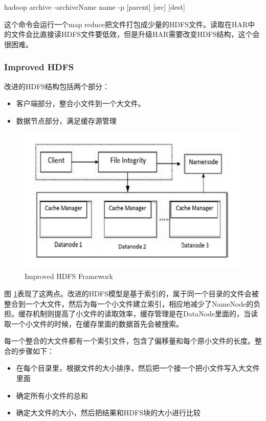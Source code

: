 \documentclass[UTF8]{ctexart}
\begin{document}
hadoop archive -archiveName name -p [parent] [src] [dest]

这个命令会运行一个map reduce把文件打包成少量的HDFS文件。读取在HAR中的文件会比直接读HDFS文件要低效，但是升级HAR需要改变HDFS结构，这个会很困难。


\subsubsection{Improved HDFS}
改进的HDFS结构\cite{ChenJ}包括两个部分：

\begin{itemize}
\item 客户端部分，整合小文件到一个大文件。
\item 数据节点部分，满足缓存源管理
\end{itemize}

\begin{figure}[h]
\centering
\includegraphics{ImprovedHDFSFramework.PNG}
\caption{Improved HDFS Framework}
\label{fig:ImprovedHDFSFramework}
\end{figure}

图 \ref{fig:ImprovedHDFSFramework}表现了这两点。改进的HDFS模型是基于索引的，属于同一个目录的文件会被整合到一个大文件，然后为每一个小文件建立索引，相应地减少了NameNode的负担。缓存机制则提高了小文件的读取效率，缓存管理是在DataNode里面的，当读取一个小文件的时候，在缓存里面的数据首先会被搜索。

每一个整合的大文件都有一个索引文件，包含了偏移量和每个原小文件的长度。整合的步骤如下：

\begin{itemize}
\item 在每个目录里，根据文件的大小排序，然后把一个接一个把小文件写入大文件里面
\item 确定所有小文件的总和
\item 确定大文件的大小，然后把结果和HDFS块的大小进行比较
\end{itemize}
\end{document}
